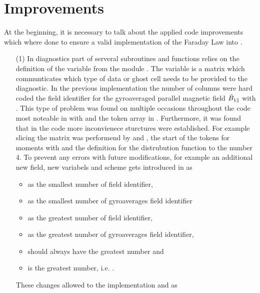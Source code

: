 \section{Improvements}
\label{sec:improvements}

At the beginning, it is necessary to talk about the applied code improvements which where done to ensure a valid implementation of the Faraday Law into {\gkw}.
\begin{enumerate}
    \item[(1)] In diagnostics part of {\gkw} serveral subroutines and functions relies on the definition of the variable  from the module . The variable  is a matrix which communticates which type of data or ghost cell needs to be provided to the diagnostic. In the previous implementation the number of columns were hard coded the field identifier for the gyroaveraged parallel magnetic field $\bar{B}_{1\parallel}$ with . This type of problem was found on multiple occasions throughout the code most noteable in  with  and the token array in . Furthermore, it was found that in the code more inconvienece sturctures were established. For example slicing the  matrix was performend by  and , the start of the tokens for moments with  and the definition for the distrubution function to the number 4. To prevent any errors with future modifications, for example an additional new field, new variabels and scheme gets introduced in  as
    \begin{itemize}
        \item {} as the smallest number of field identifier, 
        \item {} as the smallest number of gyroaverages field identifier
        \item {} as the greatest number of field identifier, 
        \item {} as the greatest number of gyroaverages field identifier,
        \item {} should always have the greatest number and
        \item {} is the greatest number, i.e. .
    \end{itemize}
    These changes allowed to the implementation  and  as 

\end{enumerate}
